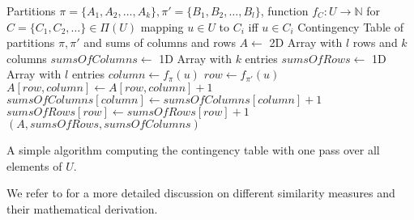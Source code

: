 		\begin{algorithm}[ht!]
			\centering
			\begin{algorithmic}
				\Require Partitions $\pi = \{ A_1, A_2, \ldots, A_k \}, \pi' = \{ B_1, B_2, \ldots, B_l \}$, function $f_C: U \rightarrow \mathbb{N}$ for $C = \{ C_1, C_2, \ldots \} \in \Pi(U)$ mapping $u \in U$ to $C_i$ iff $u \in C_i$
				\Ensure Contingency Table of partitions $\pi, \pi'$ and sums of columns and rows
				\Statex
					\State $A \gets$ 2D Array with $l$ rows and $k$ columns
					\State $sumsOfColumns \gets$ 1D Array with $k$ entries
					\State $sumsOfRows \gets$ 1D Array with $l$ entries
						\State $column \gets f_\pi(u)$
						\State $row \gets f_{\pi'}(u)$
						\Statex
						\State $A[row, column] \gets A[row, column] + 1$
						\State $sumsOfColumns[column] \gets sumsOfColumns[column] + 1$
						\State $sumsOfRows[row] \gets sumsOfRows[row] + 1$
					\EndFor
					\State \Return $(A, sumsOfRows, sumsOfColumns)$
				\EndFunction
			\end{algorithmic}
			\caption{A simple algorithm computing the contingency table with one pass over all elements of $U$.}
			\label{algo:prelims:rand:contingency}
		\end{algorithm}
		
		We refer to \cite{warrensUnderstandingAdjustedRand2022} for a more detailed discussion on different similarity measures and their mathematical derivation.
		
